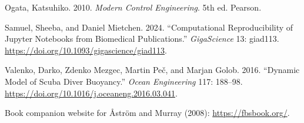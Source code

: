 \documentclass[
]{article}
\newlength{\cslhangindent}
\newlength{\cslentryspacingunit} %
\newenvironment{CSLReferences}[2] %
 {%
  \setlength{\parindent}{0pt}
  \ifodd #1
  \let\oldpar\par
  \def\par{\hangindent=\cslhangindent\oldpar}
  \fi
  \setlength{\parskip}{#2\cslentryspacingunit}
 }%
 {}
\begin{document}
\begin{CSLReferences}{1}{0}
\leavevmode{}%
Ogata, Katsuhiko. 2010. \emph{Modern Control Engineering}. 5th ed.
Pearson.

\leavevmode{}%
Samuel, Sheeba, and Daniel Mietchen. 2024. {``Computational
Reproducibility of Jupyter Notebooks from Biomedical Publications.''}
\emph{GigaScience} 13: giad113.
\url{https://doi.org/10.1093/gigascience/giad113}.

\leavevmode{}%
Valenko, Darko, Zdenko Mezgec, Martin Peč, and Marjan Golob. 2016.
{``Dynamic Model of Scuba Diver Buoyancy.''} \emph{Ocean Engineering}
117: 188--98. \url{https://doi.org/10.1016/j.oceaneng.2016.03.041}.

\end{CSLReferences}

Book companion website for Åström and Murray (2008):
\url{https://fbsbook.org/}.
\end{document}
